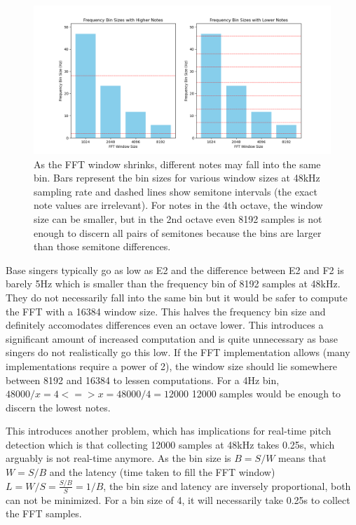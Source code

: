 \begin{figure}[ht]
    \centering
    \includegraphics[width=\textwidth]{./images/fft_bin_size_chart.png}
    \caption{As the FFT window shrinks, different notes may fall into the same bin. Bars represent the bin sizes for various window sizes at 48kHz sampling rate and dashed lines show semitone intervals (the exact note values are irrelevant). For notes in the 4th octave, the window size can be smaller, but in the 2nd octave even 8192 samples is not enough to discern all pairs of semitones because the bins are larger than those semitone differences.\label{fig:fftBinSizeChart}}
\end{figure}

Base singers typically go as low as E2 and the difference between E2 and F2 is barely 5Hz which is smaller than the frequency bin of 8192 samples at 48kHz. They do not necessarily fall into the same bin but it would be safer to compute the FFT with a 16384 window size. This halves the frequency bin size and definitely accomodates differences even an octave lower. This introduces a significant amount of increased computation and is quite unnecessary as base singers do not realistically go this low. If the FFT implementation allows (many implementations require a power of 2), the window size should lie somewhere between 8192 and 16384 to lessen computations. For a 4Hz bin, $48000/x = 4 <=> x = 48000/4 = 12000$ 12000 samples would be enough to discern the lowest notes. 

This introduces another problem, which has implications for real-time pitch detection which is that collecting 12000 samples at 48kHz takes 0.25s, which arguably is not real-time anymore. As the bin size is $B = S/W$ means that $W = S/B$ and the latency (time taken to fill the FFT window) $L = W/S = \frac{S/B}{S} = 1/B$, the bin size and latency are inversely proportional, both can not be minimized. For a bin size of 4, it will necessarily take 0.25s to collect the FFT samples.

